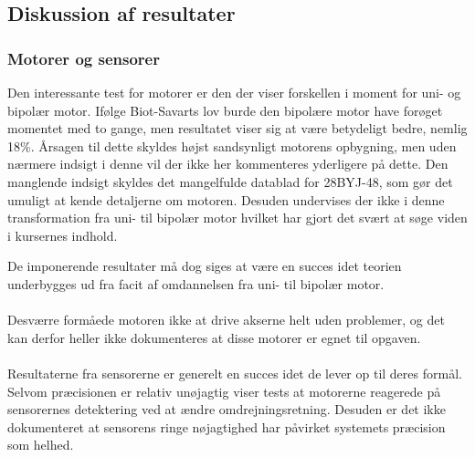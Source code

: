 \subsection{Diskussion af resultater}
\subsubsection{Motorer og sensorer}
\label{sec:HW_diskussion}
Den interessante test for motorer er den der viser forskellen i moment for uni- og bipolær motor. Ifølge Biot-Savarts lov burde den bipolære motor have forøget momentet med to gange, men resultatet viser sig at være betydeligt bedre, nemlig 18\%. Årsagen til dette skyldes højst sandsynligt motorens opbygning, men uden nærmere indsigt i denne vil der ikke her kommenteres yderligere på dette. Den manglende indsigt skyldes det mangelfulde datablad for 28BYJ-48, som gør det umuligt at kende detaljerne om motoren. Desuden undervises der ikke i denne transformation fra uni- til bipolær motor hvilket har gjort det svært at søge viden i kursernes indhold.

De imponerende resultater må dog siges at være en succes idet teorien underbygges ud fra facit af omdannelsen fra uni- til bipolær motor. 
\\
\\
Desværre formåede motoren ikke at drive akserne helt uden problemer, og det kan derfor heller ikke dokumenteres at disse motorer er egnet til opgaven.
\\
\\
Resultaterne fra sensorerne er generelt en succes idet de lever op til deres formål. Selvom præcisionen er relativ unøjagtig viser tests at motorerne reagerede på sensorernes detektering ved at ændre omdrejningsretning. Desuden er det ikke dokumenteret at sensorens ringe nøjagtighed har påvirket systemets præcision som helhed.